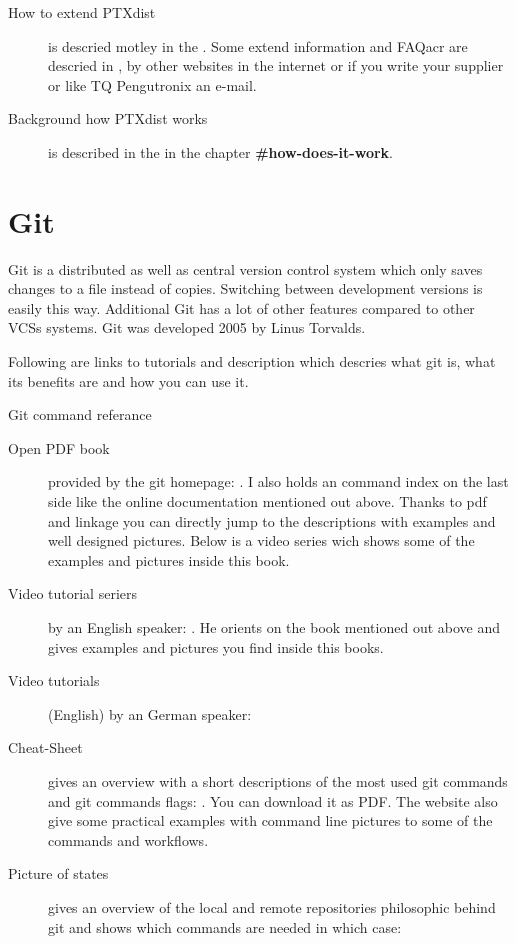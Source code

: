 \begin{description}
    \item[How to extend PTXdist] is descried motley in the
        \textbf{\cite[developer guide]{ptxdist_developer}}. Some extend
        information and \gls{FAQacr} are descried in
        \textbf{\cite{ptxdist_workflows}}, by other websites in the internet
        or if you write your supplier or like TQ Pengutronix an e-mail.

    \item[Background how PTXdist works] is described in the \cite[PTXdist Users
        Manual]{ptxdist_manual} in the chapter \textbf{\#how-does-it-work}.
\end{description}


\section{Git}%
\label{sec:git}
Git is a distributed as well as central version control system which only saves
changes to a file instead of copies. Switching between development versions is
easily this way. Additional Git has a lot of other features compared to other
\glspl{VCS} systems. Git was developed 2005 by Linus Torvalds.

Following are links to tutorials and description which descries what git is,
what its benefits are  and how you can use it.  \\



\begin{description}
    \item[Git command referance] \cite{gitdoc}
    \item[Open PDF book] provided by the git homepage: \cite{Chacon2014}. I also
        holds an command index on the last side like the online documentation
        mentioned out above. Thanks to pdf and linkage you
        can directly jump to the descriptions with examples and well designed
        pictures. Below is a video series wich shows some of the examples and
        pictures inside this book.
    \item[Video tutorial seriers] by an English speaker:
        \cite{gitvideotutorial_en}. He orients on the book mentioned out above
        and gives examples and pictures you find inside this books.
    \item[Video tutorials] (English) by an German speaker:
        \cite{gitvideotutorial_de_en}
    \item[Cheat-Sheet] gives an overview with a short descriptions of the most
        used git commands and git commands flags: \cite{git_cheat_sheet}. You
        can download it as PDF. The website also give some practical examples
        with command line pictures to some of the commands and workflows.
    \item[Picture of states] gives an overview of the local and remote
        repositories philosophic behind git and shows which commands are
        needed in which case:
        \cite{git_picture}
\end{description}
